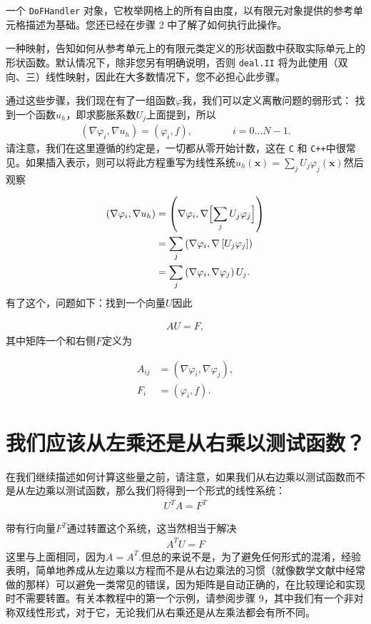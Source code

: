 \documentclass[12pt, a4paper]{article}
\numberwithin{equation}{section} %
\begin{document}
一个 \verb|DoFHandler| 对象，它枚举网格上的所有自由度，以有限元对象提供的参考单元格描述为基础。您还已经在步骤 2 中了解了如何执行此操作。

一种映射，告知如何从参考单元上的有限元类定义的形状函数中获取实际单元上的形状函数。默认情况下，除非您另有明确说明，否则 \verb|deal.II| 将为此使用（双向、三）线性映射，因此在大多数情况下，您不必担心此步骤。


通过这些步骤，我们现在有了一组函数$\varphi$我，我们可以定义离散问题的弱形式： 找到一个函数$u_h$，即求膨胀系数$U_j$上面提到，所以
\begin{align*} (\nabla\varphi_i, \nabla u_h) = (\varphi_i, f), \qquad\qquad i=0\ldots N-1. \end{align*}
请注意，我们在这里遵循的约定是，一切都从零开始计数，这在 \verb|C| 和 \verb|C++|中很常见。如果插入表示，则可以将此方程重写为线性系统$u_h(\mathbf x)=\sum_j U_j \varphi_j(\mathbf x)$然后观察

\begin{align*} 
(\nabla\varphi_i, \nabla u_h) &= \left(\nabla\varphi_i, \nabla \Bigl[\sum_j U_j \varphi_j\Bigr]\right) \\ 
&= \sum_j \left(\nabla\varphi_i, \nabla \left[U_j \varphi_j\right]\right) \\
 &= \sum_j \left(\nabla\varphi_i, \nabla \varphi_j \right) U_j. 
\end{align*}
有了这个，问题如下：找到一个向量$U$因此

\begin{align*} A U = F, \end{align*}
其中矩阵一个和右侧$F$定义为

\begin{align*} A_{ij} &= (\nabla\varphi_i, \nabla \varphi_j), \\ F_i &= (\varphi_i, f). \end{align*}


\newpage
\section{我们应该从左乘还是从右乘以测试函数？}

在我们继续描述如何计算这些量之前，请注意，如果我们从右边乘以测试函数而不是从左边乘以测试函数，那么我们将得到一个形式的线性系统：
\begin{align*} U^T A = F^T \end{align*}

带有行向量$F^T$通过转置这个系统，这当然相当于解决
\begin{align*} A^T U = F \end{align*}
这里与上面相同，因为$A = A^T$.但总的来说不是，为了避免任何形式的混淆，经验表明，简单地养成从左边乘以方程而不是从右边乘法的习惯（就像数学文献中经常做的那样）可以避免一类常见的错误，因为矩阵是自动正确的，在比较理论和实现时不需要转置。有关本教程中的第一个示例，请参阅步骤 9，其中我们有一个非对称双线性形式，对于它，无论我们从右乘还是从左乘法都会有所不同。
\end{document}
